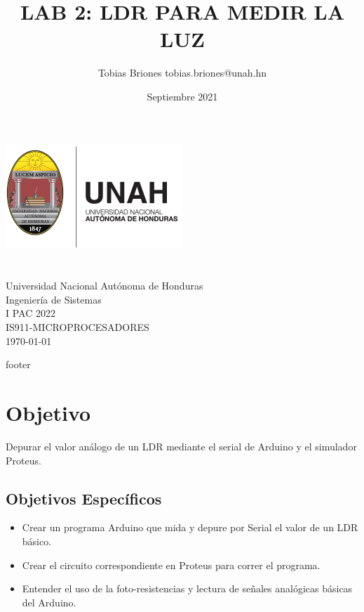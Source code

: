 \documentclass{article}
\title{LAB 2: LDR PARA MEDIR LA LUZ}
\author{Tobias Briones \bigbreak tobias.briones@unah.hn}
\date{Septiembre 2021}
\begin{document}
    \makeatletter
    \begin{titlepage}
        \begin{center}
            \includegraphics[width=0.3\linewidth]{images/logo-unah}\\[4ex]
            {\huge \bfseries \@title
            \vspace{1cm}}\\[2ex]
            {\LARGE \@author}\\[50ex]

            {\large
            Universidad Nacional Autónoma de Honduras\\
            Ingeniería de Sistemas\\
            I PAC 2022\\
            IS911-MICROPROCESADORES
            }\\[2ex]

            {\large \today}
        \end{center}
    \end{titlepage}
    \makeatother
    \thispagestyle{empty}
    \newpage

    {footer}

    \section{Objetivo}\label{sec:objetivo}

    Depurar el valor análogo de un LDR mediante el serial de Arduino y el
    simulador Proteus.

    \subsection{Objetivos Específicos}\label{subsec:objetivos-específicos}

    \begin{itemize}
        \item Crear un programa Arduino que mida y depure por Serial el valor
        de un LDR básico.
        \item Crear el circuito correspondiente en Proteus para correr el
        programa.
        \item Entender el uso de la foto-resistencias y lectura de señales
        analógicas básicas del Arduino.
    \end{itemize}
\end{document}
